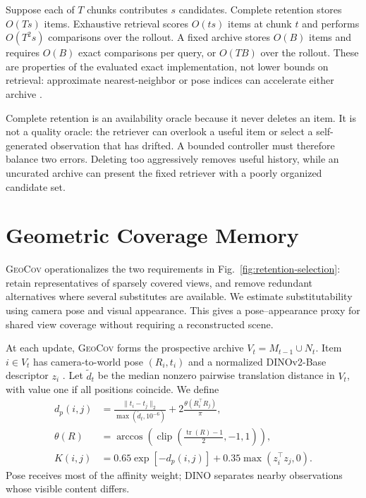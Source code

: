 \documentclass[10pt,twocolumn]{article}
\newcommand{\Geo}{\textsc{GeoCov}\xspace}
\begin{document}
Suppose each of $T$ chunks contributes $s$ candidates. Complete retention
stores $O(Ts)$ items. Exhaustive retrieval scores $O(ts)$ items at chunk $t$
and performs $O(T^2s)$ comparisons over the rollout. A fixed archive stores
$O(B)$ items and requires $O(B)$ exact comparisons per query, or $O(TB)$ over
the rollout. These are properties of the evaluated exact implementation, not
lower bounds on retrieval: approximate nearest-neighbor or pose indices can
accelerate either archive \citep{faiss}.

Complete retention is an availability oracle because it never deletes an
item. It is not a quality oracle: the retriever can overlook a useful item or
select a self-generated observation that has drifted. A bounded controller
must therefore balance two errors. Deleting too aggressively removes useful
history, while an uncurated archive can present the fixed retriever with a
poorly organized candidate set.

\section{Geometric Coverage Memory}
\label{sec:method}

\Geo operationalizes the two requirements in
Fig.~\ref{fig:retention-selection}: retain representatives of sparsely covered
views, and remove redundant alternatives where several substitutes are
available. We estimate substitutability using camera pose and visual
appearance. This gives a pose--appearance proxy for shared view coverage
without requiring a reconstructed scene.

At each update, \Geo forms the prospective archive
$V_t=M_{t-1}\cup N_t$. Item $i\in V_t$ has camera-to-world pose $(R_i,t_i)$
and a normalized DINOv2-Base descriptor $z_i$ \citep{dinov2}. Let
$\widetilde d_t$ be the median nonzero pairwise translation distance in
$V_t$, with value one if all positions coincide. We define
\begin{align}
 d_p(i,j) &=
 \frac{\lVert t_i-t_j\rVert_2}{\max(\widetilde d_t,10^{-6})}
 +2\frac{\theta(R_i^\top R_j)}{\pi}, \\
 \theta(R) &= \arccos\!\left(\operatorname{clip}
 \left(\frac{\operatorname{tr}(R)-1}{2},-1,1\right)\right), \\
 K(i,j) &= 0.65\exp[-d_p(i,j)]
 +0.35\max(z_i^\top z_j,0).
 \label{eq:affinity}
\end{align}
Pose receives most of the affinity weight; DINO separates nearby observations
whose visible content differs.
\end{document}
